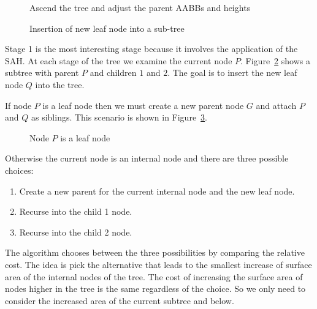 \documentclass{article}
\begin{document}
\begin{figure}
	\begin{center}
		
	\end{center}
	\caption{Ascend the tree and adjust the parent AABBs and heights}
	\label{fig:tree_insert3}
\end{figure}

\begin{figure}
	\begin{center}
		
	\end{center}
	\caption{Insertion of new leaf node into a sub-tree}
	\label{fig:new_leaf}
\end{figure}

Stage 1 is the most interesting stage because it involves the application of the SAH. At each stage of the tree we examine the current node $P$. Figure~\ref{fig:new_leaf} shows a subtree with parent $P$ and children $1$ and $2$. The goal is to insert the new leaf node $Q$ into the tree.

If node $P$ is a leaf node then we must create a new parent node $G$ and attach $P$ and $Q$ as siblings. This scenario is shown in Figure~\ref{fig:single_leaf}.

\begin{figure}
	\begin{center}
		
	\end{center}
	\caption{Node $P$ is a leaf node}
	\label{fig:single_leaf}
\end{figure}

Otherwise the current node is an internal node and there are three possible choices:
\begin{enumerate}
	\item Create a new parent for the current internal node and the new leaf node.
	\item Recurse into the child 1 node.
	\item Recurse into the child 2 node.
\end{enumerate}
The algorithm chooses between the three possibilities by comparing the relative cost. The idea is pick the alternative that leads to the smallest increase of surface area of the internal nodes of the tree. The cost of increasing the surface area of nodes higher in the tree is the same regardless of the choice. So we only need to consider the increased area of the current subtree and below.
\end{document}
